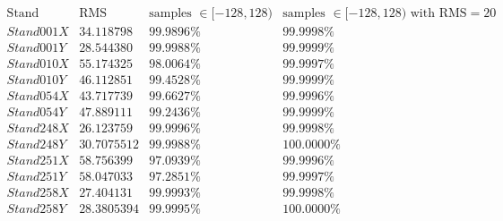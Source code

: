 $ \begin{array}{c||c|c|c}  
\text{Stand} & \text{RMS} & \text{samples }\in [-128,128) & \text{samples }\in [-128,128)\text{ with RMS}=20 \\ 
Stand001X & 34.118798 & 99.9896\% & 99.9998\% \\ 
Stand001Y & 28.544380 & 99.9988\% & 99.9999\% \\ 
Stand010X & 55.174325 & 98.0064\% & 99.9997\% \\ 
Stand010Y & 46.112851 & 99.4528\% & 99.9999\% \\ 
Stand054X & 43.717739 & 99.6627\% & 99.9996\% \\ 
Stand054Y & 47.889111 & 99.2436\% & 99.9999\% \\ 
Stand248X & 26.123759 & 99.9996\% & 99.9998\% \\ 
Stand248Y & 30.7075512 & 99.9988\% & 100.0000\% \\ 
Stand251X & 58.756399 & 97.0939\% & 99.9996\% \\ 
Stand251Y & 58.047033 & 97.2851\% & 99.9997\% \\ 
Stand258X & 27.404131 & 99.9993\% & 99.9998\% \\ 
Stand258Y & 28.3805394 & 99.9995\% & 100.0000\%
 \end{array}  
$